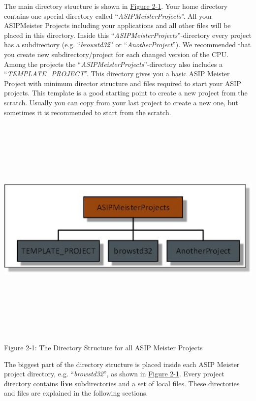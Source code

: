 \documentclass[
]{article}
\begin{document}
The main directory structure is shown in
\protect\hyperlink{Fig21}{Figure 2-1}. Your home directory contains one
special directory called ``\emph{ASIPMeisterProjects}''. All your
ASIPMeister Projects including your applications and all other files
will be placed in this directory. Inside this
``\emph{ASIPMeisterProjects}''-directory every project has a
subdirectory (e.g. ``\emph{browstd32}'' or ``\emph{AnotherProject}'').
We recommended that you create new subdirectory/project for each changed
version of the CPU. Among the projects the
``\emph{ASIPMeisterProjects}''-directory also includes a
``\emph{TEMPLATE\_PROJECT}''. This directory gives you a basic ASIP
Meister Project with minimum director structure and files required to
start your ASIP projects. This template is a good starting point to
create a new project from the scratch. Usually you can copy from your
last project to create a new one, but sometimes it is recommended to
start from the scratch.
\includegraphics[width=5.86597in,height=4.73125in]{2-1.png}
Figure 2‑1:\protect\hypertarget{Fig21}{}{} The Directory Structure for
all ASIP Meister Projects

The biggest part of the directory structure is placed inside each ASIP
Meister project directory, e.g. ``\emph{browstd32}'', as shown in
\protect\hyperlink{Fig21}{Figure 2-1}. Every project directory contains
\textbf{five} subdirectories and a set of local files. These directories
and files are explained in the following sections.
\end{document}
